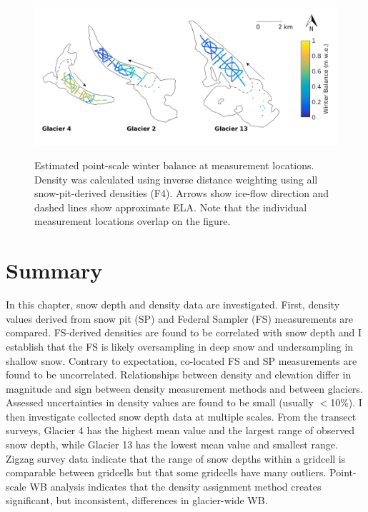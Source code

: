 \documentclass{sfuthesis}
\begin{document}
\begin{figure}[H]
	\centering
	\includegraphics[width =\textwidth]{SWEmap_opt9.png}\\
	\caption{Estimated point-scale winter balance at measurement locations. Density was calculated using inverse distance weighting using all snow-pit-derived densities (F4). Arrows show ice-flow direction and dashed lines show approximate ELA. Note that the individual measurement locations overlap on the figure.}
	\label{fig:SWEmap_F4}
\end{figure}


\section{Summary}

In this chapter, snow depth and density data are investigated. First, density values derived from snow pit (SP) and Federal Sampler (FS) measurements are compared. FS-derived densities are found to be correlated with snow depth and I establish that the FS is likely oversampling in deep snow and undersampling in shallow snow. Contrary to expectation, co-located FS and SP measurements are found to be uncorrelated. Relationships between density and elevation differ in magnitude and sign between density measurement methods and between glaciers. Assessed uncertainties in density values are found to be small (usually $<$10\%). I then investigate collected snow depth data at multiple scales. From the transect surveys, Glacier 4 has the highest mean value and the largest range of observed snow depth, while Glacier 13 has the lowest mean value and smallest range. Zigzag survey data indicate that the range of snow depths within a gridcell is comparable between gridcells but that some gridcells have many outliers. Point-scale WB analysis indicates that the density assignment method creates significant, but inconsistent, differences in glacier-wide WB. 
\end{document}
